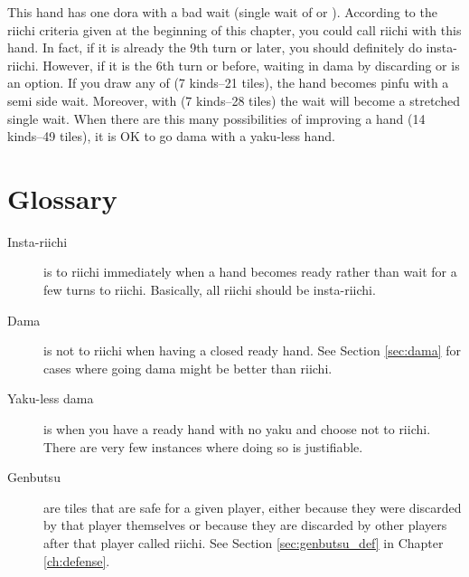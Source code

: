 This hand has one {\jap dora} with a bad wait (single wait of {\LARGE {}} or {\LARGE {}}). According to the riichi criteria given at the beginning of this chapter, you could call riichi with this hand. In fact, if it is already the 9th turn or later, you should definitely do insta-riichi. However, if it is the 6th turn or before, waiting in {\jap dama} by discarding {\LARGE {}} or {\LARGE{}} is an option. 
If you draw any of {\LARGE{}} (7 kinds--21 tiles), the hand becomes {\jap pinfu} with a semi side wait. Moreover, with {\LARGE{}} (7 kinds--28 tiles) the wait will become a stretched single wait. When there are this many possibilities of improving a hand (14 kinds--49 tiles), it is OK to go {\jap dama} with a {\jap yaku}-less hand.

\newpage
\section{Glossary}

\begin{description}
\item[Insta-riichi] is to riichi immediately when a hand becomes ready rather than wait for a few turns to riichi. Basically, all riichi should be insta-riichi.
\item[{\jap Dama}] is not to riichi when having a closed ready hand. See Section \ref{sec:dama} for cases where going {\jap dama} might be better than riichi. 
\item[{\jap Yaku}-less {\jap dama}] is when you have a ready hand with no {\jap yaku} and choose not to riichi. There are very few instances where doing so is justifiable. 
\item[{\jap Genbutsu}] are tiles that are safe for a given player, either because they were discarded by that player themselves or because they are discarded by other players after that player called riichi. See Section \ref{sec:genbutsu_def} in Chapter \ref{ch:defense}.
\end{description}

